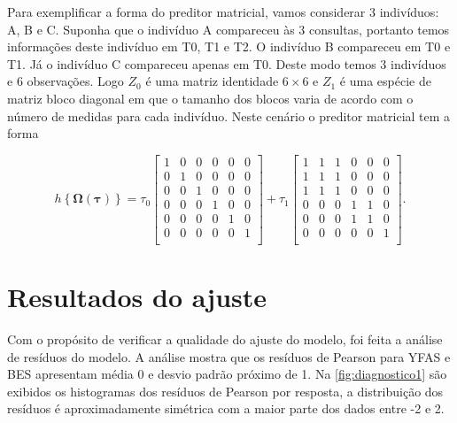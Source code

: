 Para exemplificar a forma do preditor matricial, vamos considerar 3 indivíduos: A, B e C. Suponha que o indivíduo A compareceu às 3 consultas, portanto temos informações deste indivíduo em T0, T1 e T2. O indivíduo B compareceu em T0 e T1. Já o indivíduo C compareceu apenas em T0. Deste modo temos 3 indivíduos e 6 observações. Logo $Z_0$ é uma matriz identidade $6 \times 6$ e $Z_1$ é uma espécie de matriz bloco diagonal em que o tamanho dos blocos varia de acordo com o número de medidas para cada indivíduo. Neste cenário o preditor matricial tem a forma

\begin{equation}
h\left \{ \boldsymbol{\Omega}(\boldsymbol{\tau}) \right \} = 
\tau_0 \begin{bmatrix}
1 & 0 & 0 & 0 & 0 & 0\\ 
0 & 1 & 0 & 0 & 0 & 0\\ 
0 & 0 & 1 & 0 & 0 & 0\\ 
0 & 0 & 0 & 1 & 0 & 0\\ 
0 & 0 & 0 & 0 & 1 & 0\\ 
0 & 0 & 0 & 0 & 0 & 1\\ 
\end{bmatrix} + 
\tau_1 \begin{bmatrix}
1 & 1 & 1 & 0 & 0 & 0\\ 
1 & 1 & 1 & 0 & 0 & 0\\ 
1 & 1 & 1 & 0 & 0 & 0\\ 
0 & 0 & 0 & 1 & 1 & 0\\ 
0 & 0 & 0 & 1 & 1 & 0\\ 
0 & 0 & 0 & 0 & 0 & 1\\ 
\end{bmatrix}.
\end{equation}


\section{Resultados do ajuste}

Com o propósito de verificar a qualidade do ajuste do modelo, foi feita a análise de resíduos do modelo. A análise mostra que os resíduos de Pearson para YFAS e BES apresentam média 0 e desvio padrão próximo de 1. Na \autoref{fig:diagnostico1} são exibidos os histogramas dos resíduos de Pearson por resposta, a distribuição dos resíduos é aproximadamente simétrica com a maior parte dos dados entre -2 e 2.

